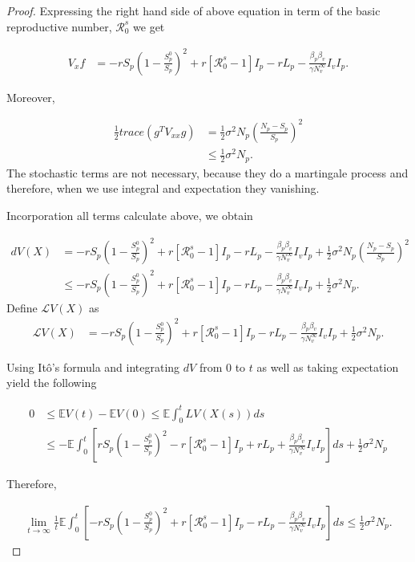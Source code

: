 \begin{proof}
	Expressing the right hand side of above equation in term of the basic reproductive number, $\mathcal{R}^s_0$ we get
	
	\begin{align*}
		V_x f &=
		-rS_p\left(1-\frac{S_p^0}{S_p}\right)^2 + r\left[\mathcal{R}^s_0-1\right]I_p-rL_p-\frac{\beta_p\beta_v}{\gamma N^\infty_v}I_vI_p.
	\end{align*}

	Moreover,
	
	\begin{align*}
		\frac{1}{2}trace(g^TV_{xx}g) 
			&=
				\frac{1}{2} \sigma^2N_p\left(\frac{N_p-S_p}{S_p}\right)^2\\
			&\leq
				\frac{1}{2} \sigma^2 N_p.
	\end{align*}
	The stochastic terms are not necessary, because they do a martingale process and therefore, when we use integral and expectation they vanishing.
	
	Incorporation all terms calculate above, we obtain
	
		
	\begin{align*}
		dV(X) 
			&=
				-rS_p\left(1-\frac{S_p^0}{S_p}\right)^2 + r\left[\mathcal{R}^s_0-1\right]I_p-rL_p-\frac{\beta_p\beta_v}{\gamma N^\infty_v}I_vI_p+\frac{1}{2} \sigma^2N_p\left(\frac{N_p-S_p}{S_p}\right)^2\\
			&\leq
				-rS_p\left(1-\frac{S_p^0}{S_p}\right)^2 + r\left[\mathcal{R}^s_0-1\right]I_p-rL_p-\frac{\beta_p\beta_v}{\gamma N^\infty_v}I_vI_p+\frac{1}{2} \sigma^2 N_p.
	\end{align*}
	Define $\mathcal{L}V(X)$ as
	\begin{align*}
		\mathcal{L}V(X) 
			&=
				-rS_p\left(1-\frac{S_p^0}{S_p}\right)^2 + r\left[\mathcal{R}^s_0-1\right]I_p-rL_p-\frac{\beta_p\beta_v}{\gamma N^\infty_v}I_vI_p+\frac{1}{2} \sigma^2 N_p.
	\end{align*}
	
	Using It\^{o}'s formula and integrating $dV$ from $0$ to $t$ as well as taking expectation yield the following
	
	\begin{align*}
		0 
			&\leq
				\mathbb{E}V(t)-\mathbb{E}V(0)\leq\mathbb{E}\int_{0}^{t}LV(X(s))ds\\
			&\leq
				-\mathbb{E}\int_{0}^{t}\left[rS_p\left(1-\frac{S_p^0}{S_p}\right)^2 - r\left[\mathcal{R}^s_0-1\right]I_p+rL_p+\frac{\beta_p\beta_v}{\gamma N^\infty_v}I_vI_p\right]ds+ \frac{1}{2}\sigma^2 N_p
	\end{align*}
	
	Therefore,
	
	\begin{align*}
	\lim\limits_{t\rightarrow \infty}\frac{1}{t} 
	\mathbb{E}\int_{0}^{t}\left[-rS_p\left(1-\frac{S_p^0}{S_p}\right)^2 + r\left[\mathcal{R}^s_0-1\right]I_p-rL_p-\frac{\beta_p\beta_v}{\gamma N^\infty_v}I_vI_p\right]ds\leq \frac{1}{2}\sigma^2 N_p.
	\end{align*}
		
\end{proof}
